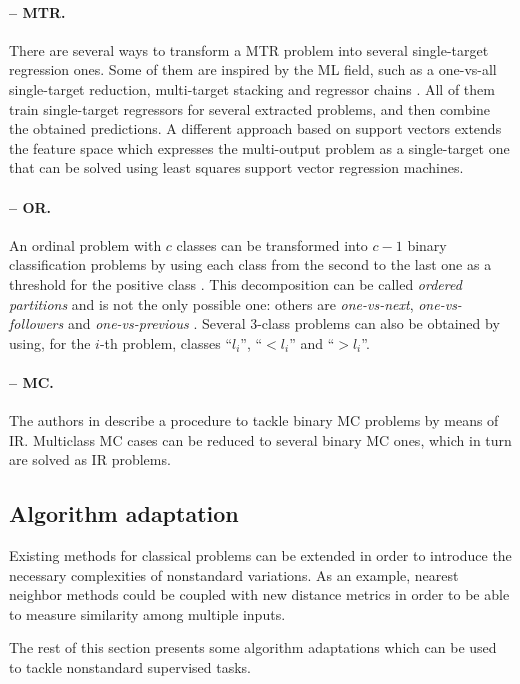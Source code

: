 \paragraph{-- MTR.} There are several ways to transform a MTR problem into several single-target regression ones. Some of them are inspired by the ML field, such as a one-vs-all single-target reduction, multi-target stacking and regressor chains \cite{mtrviaml}. All of them train single-target regressors for several extracted problems, and then combine the obtained predictions. A different approach based on support vectors \cite{mtr-lssvr} extends the feature space which expresses the multi-output problem as a single-target one that can be solved using least squares support vector regression machines.

\paragraph{-- OR.} An ordinal problem with $c$ classes can be transformed into $c-1$ binary classification problems by using each class from the second to the last one as a threshold for the positive class \cite{ord-simple}. This decomposition can be called \emph{ordered partitions} and is not the only possible one: others are \emph{one-vs-next}, \emph{one-vs-followers} and \emph{one-vs-previous} \cite{ord-survey}. Several 3-class problems can also be obtained by using, for the $i$-th problem, classes ``$l_i$'', ``$<l_i$'' and ``$>l_i$''.

\paragraph{-- MC.} The authors in \cite{monotonicity} describe a procedure to tackle binary MC problems by means of IR. Multiclass MC cases can be reduced to several binary MC ones, which in turn are solved as IR problems. 

\subsection{Algorithm adaptation}

Existing methods for classical problems can be extended in order to introduce the necessary complexities of nonstandard variations. As an example, nearest neighbor methods could be coupled with new distance metrics in order to be able to measure similarity among multiple inputs.

The rest of this section presents some algorithm adaptations which can be used to tackle nonstandard supervised tasks.


